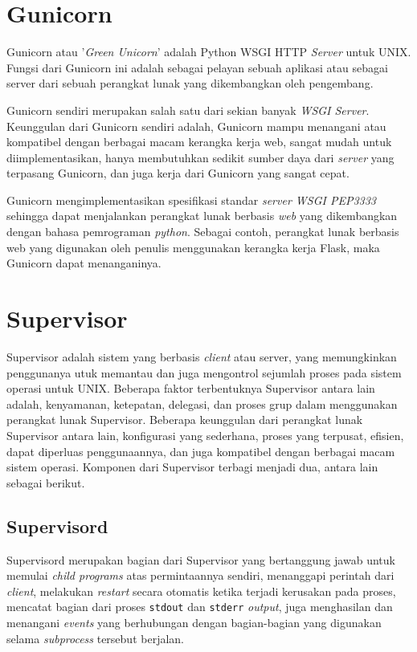 \section{Gunicorn}
Gunicorn atau '\textit{Green Unicorn}' adalah {Python} WSGI HTTP \textit{Server} untuk UNIX. Fungsi dari Gunicorn ini adalah sebagai pelayan sebuah aplikasi atau sebagai server dari sebuah perangkat lunak yang dikembangkan oleh pengembang. \cite{bab2-gunicorn}

Gunicorn sendiri merupakan salah satu dari sekian banyak \textit{WSGI Server}. Keunggulan dari Gunicorn sendiri adalah, Gunicorn mampu menangani atau kompatibel dengan berbagai macam kerangka kerja web, sangat mudah untuk diimplementasikan, hanya membutuhkan sedikit sumber daya dari \textit{server} yang terpasang Gunicorn, dan juga kerja dari Gunicorn yang sangat cepat.

Gunicorn mengimplementasikan spesifikasi standar \textit{server WSGI PEP3333} sehingga dapat menjalankan perangkat lunak berbasis \textit{web} yang dikembangkan dengan bahasa pemrograman \textit{python}. Sebagai contoh, perangkat lunak berbasis web yang digunakan oleh penulis menggunakan kerangka kerja Flask, maka Gunicorn dapat menanganinya.

\section{Supervisor}
Supervisor adalah sistem yang berbasis \textit{client} atau server, yang memungkinkan penggunanya utuk memantau dan juga mengontrol sejumlah proses pada sistem operasi untuk UNIX. Beberapa faktor terbentuknya Supervisor antara lain adalah, kenyamanan, ketepatan, delegasi, dan proses grup dalam menggunakan perangkat lunak Supervisor. Beberapa keunggulan dari perangkat lunak Supervisor antara lain, konfigurasi yang sederhana, proses yang terpusat, efisien, dapat diperluas penggunaannya, dan juga kompatibel dengan berbagai macam sistem operasi. Komponen dari Supervisor terbagi menjadi dua, antara lain sebagai berikut.

\subsection{Supervisord}
Supervisord merupakan bagian dari Supervisor yang bertanggung jawab untuk memulai \textit{child programs} atas permintaannya sendiri, menanggapi perintah dari \textit{client}, melakukan \textit{restart} secara otomatis ketika terjadi kerusakan pada proses, mencatat bagian dari proses \texttt{stdout} dan \texttt{stderr} \textit{output}, juga menghasilan dan menangani \textit{events} yang berhubungan dengan bagian-bagian yang digunakan selama \textit{subprocess} tersebut berjalan.

